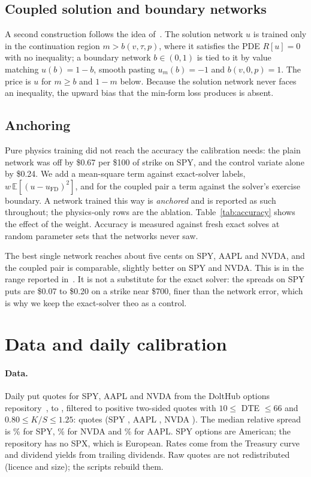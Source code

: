 \documentclass[11pt]{article}
\begin{document}
\subsection{Coupled solution and boundary networks}
A second construction follows the idea of~\cite{rohan2026coupled}. The solution network $u$ is trained only in the continuation region $m>b(v,\tau,p)$, where it satisfies the PDE $R[u]=0$ with no inequality; a boundary network $b\in(0,1)$ is tied to it by value matching $u(b)=1-b$, smooth pasting $u_m(b)=-1$ and $b(v,0,p)=1$. The price is $u$ for $m\ge b$ and $1-m$ below. Because the solution network never faces an inequality, the upward bias that the min-form loss produces is absent.

\subsection{Anchoring}
Pure physics training did not reach the accuracy the calibration needs: the plain network was off by \$0.67 per \$100 of strike on SPY, and the control variate alone by \$0.24. We add a mean-square term against exact-solver labels, $w\,\mathbb E[(u-u_{\mathrm{FD}})^2]$, and for the coupled pair a term against the solver's exercise boundary. A network trained this way is \emph{anchored} and is reported as such throughout; the physics-only rows are the ablation. Table~\ref{tab:accuracy} shows the effect of the weight. Accuracy is measured against fresh exact solves at random parameter sets that the networks never saw.

The best single network reaches about five cents on SPY, AAPL and NVDA, and the coupled pair is comparable, slightly better on SPY and NVDA. This is in the range reported in~\cite{rohan2026coupled}. It is not a substitute for the exact solver: the spreads on SPY puts are \$0.07 to \$0.20 on a strike near \$700, finer than the network error, which is why we keep the exact-solver theo as a control.

\section{Data and daily calibration}
\paragraph{Data.}
Daily put quotes for SPY, AAPL and NVDA from the DoltHub options repository~\cite{dolthub2025options}, \firstDate{} to \lastDate{}, filtered to positive two-sided quotes with $10\le$ DTE $\le 66$ and $0.80\le K/S\le1.25$: \nQuotes{} quotes (SPY \nSPY{}, AAPL \nAAPL{}, NVDA \nNVDA{}). The median relative spread is \sprSPY\% for SPY, \sprNVDA\% for NVDA and \sprAAPL\% for AAPL. SPY options are American; the repository has no SPX, which is European. Rates come from the Treasury curve and dividend yields from trailing dividends. Raw quotes are not redistributed (licence and size); the scripts rebuild them.
\end{document}
